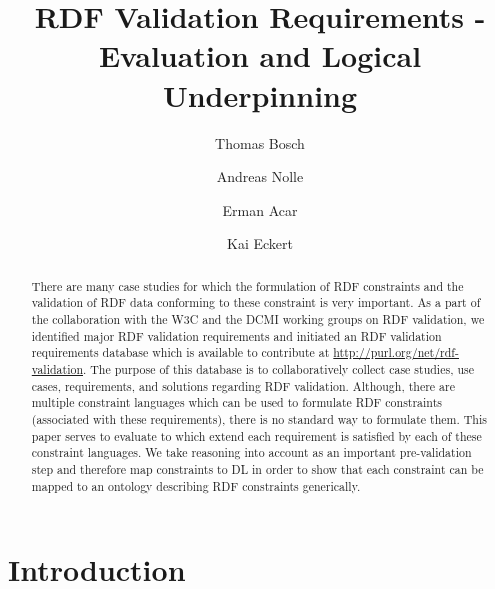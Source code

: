 \documentclass{llncs}
\begin{document}
\title{RDF Validation Requirements - Evaluation and Logical Underpinning}
\subtitle{}
  \author{Thomas Bosch \and Andreas Nolle \and Erman Acar \and Kai Eckert }
 

\maketitle              
\begin{abstract}
There are many case studies for which the formulation of RDF constraints and the validation of RDF data conforming to these constraint is very important. As a part of the collaboration with the W3C and the DCMI working groups on RDF validation, we identified major RDF validation requirements
and initiated an RDF validation requirements database which is available to contribute at \url{http://purl.org/net/rdf-validation}.
The purpose of this database is to collaboratively collect case studies, use cases, requirements, and solutions regarding RDF validation. Although, there are multiple constraint languages which can be used to formulate RDF constraints (associated with these requirements), 
there is no standard way to formulate them. This paper serves to evaluate to which extend each requirement is satisfied by each of these constraint languages. We take reasoning into account  as an important pre-validation step and therefore map constraints to DL
in order to show that each constraint can be mapped to an ontology describing RDF constraints generically.


\end{abstract}


\section{Introduction}
\end{document}
